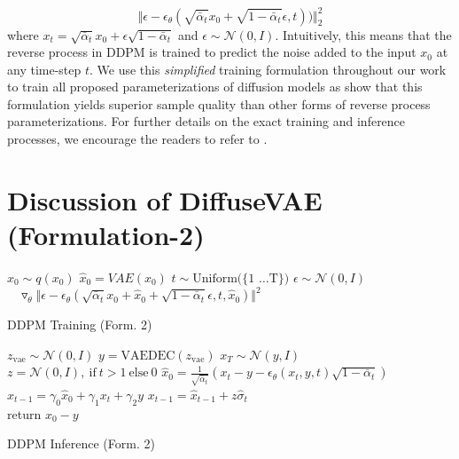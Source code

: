 \documentclass[10pt]{article} \usepackage[accepted]{tmlr}
\begin{document}
\begin{equation}
\Vert \epsilon - \epsilon_{\theta}(\sqrt{\bar{\alpha}_t}x_0 + \sqrt{1 - \bar{\alpha}_t}\epsilon, t)) \Vert_2^2
\label{eqn:ddpm_simplified}
\end{equation}
where $x_t = \sqrt{\bar{\alpha}_t}x_0 + \epsilon \sqrt{1-\bar{\alpha}_t}$ and $\epsilon \sim \mathcal{N}(0, I)$. Intuitively, this means that the reverse process in DDPM is trained to predict the noise added to the input $x_0$ at any time-step $t$. 
We use this \textit{simplified} training formulation throughout our work to train all proposed parameterizations of diffusion models as \citep{ho2020denoising} show that this formulation yields superior sample quality than other forms of reverse process parameterizations. For further details on the exact training and inference processes, we encourage the readers to refer to \citep{ho2020denoising}.

\newpage
\section{Discussion of DiffuseVAE (Formulation-2)}
\label{sec:appendix_b}

\begin{minipage}[t]{0.5\linewidth}
\null
\begin{algorithm}[H]
\begin{algorithmic}
\Repeat
      \State $x_0 \sim q(x_0)$
      \State $\hat{x}_0 = VAE(x_0)$
      \State $t \sim \text{Uniform(\{1 \ldots T\})}$
      \State $\epsilon \sim \mathcal{N}(0, I)$
      \State {}
      \State $\:\:\:\: \triangledown_{\theta}\Vert\epsilon - \epsilon_{\theta}(\sqrt{\bar{\alpha}_t}x_0 + \hat{x}_0 + \sqrt{1 - \bar{\alpha}_t}\epsilon, t, \hat{x}_0)\Vert^2$
	\caption{DDPM Training (Form. 2)}
	\label{algo:form2_training}
\end{algorithmic}
\end{algorithm}
\end{minipage}
\begin{minipage}[t]{0.5\linewidth}
\null
\begin{algorithm}[H]
\begin{algorithmic}
\State $z_{\text{vae}} \sim \mathcal{N}(0, I)$
      \State $y = \text{VAEDEC}(z_{\text{vae}})$
	  \State $x_T \sim \mathcal{N}(y, I)$
    	\State $z = \mathcal{N}(0, I), \:\text{if} \: t > 1 \:\text{else} \:0$
    	\State $\hat{x}_0 = \frac{1}{\sqrt{\bar{\alpha}_t}} (x_t - y - \epsilon_{\theta}(x_t, y, t) \sqrt{1 - \bar{\alpha}_t})$
    	\State $\hat{x}_{t-1} = \gamma_0\hat{x}_0 + \gamma_1x_t + \gamma_2y$
    	\State $x_{t-1} = \hat{x}_{t-1} + z\hat{\sigma}_t$
    	\EndFor\\
    	\State return $x_0 - y$
	\caption{DDPM Inference (Form. 2)}
	\label{algo:form2_inference}
\end{algorithmic}
\end{algorithm}
\end{minipage}
\end{document}
